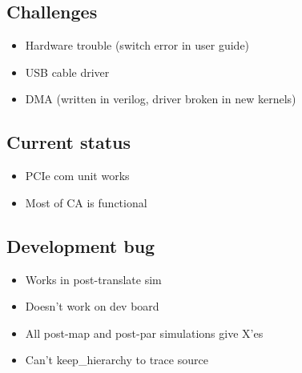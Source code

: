 \subsection{Challenges}

\begin{itemize}
    \item Hardware trouble (switch error in user guide)
    \item USB cable driver
    \item DMA (written in verilog, driver broken in new kernels)
\end{itemize}

\subsection{Current status}

\begin{itemize}
    \item PCIe com unit works
    \item Most of CA is functional
\end{itemize}

\subsection{Development bug}

\begin{itemize}
    \item Works in post-translate sim
    \item Doesn't work on dev board
    \item All post-map and post-par simulations give X'es
    \item Can't keep\_hierarchy to trace source
\end{itemize}

